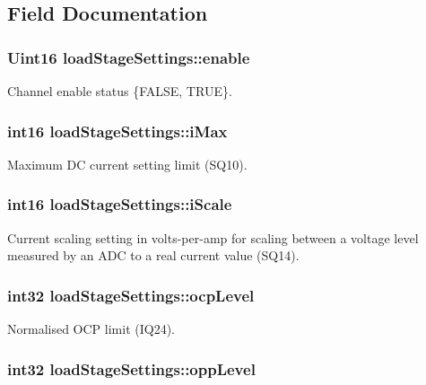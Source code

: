 \subsection{Field Documentation}
\hypertarget{a00008_af9332d3c3009b081949115a9fdfbcea4}{
\subsubsection[{enable}]{\setlength{\rightskip}{0pt plus 5cm}Uint16 load\-Stage\-Settings\-::enable}}\label{a00008_af9332d3c3009b081949115a9fdfbcea4}
Channel enable status \{F\-A\-L\-S\-E, T\-R\-U\-E\}. \hypertarget{a00008_a8e5919538d441c401e9cb53d50d0bdff}{
\subsubsection[{i\-Max}]{\setlength{\rightskip}{0pt plus 5cm}int16 load\-Stage\-Settings\-::i\-Max}}\label{a00008_a8e5919538d441c401e9cb53d50d0bdff}
Maximum D\-C current setting limit (S\-Q10). \hypertarget{a00008_ad9dd47136ae5953dff220a935d0aaa45}{
\subsubsection[{i\-Scale}]{\setlength{\rightskip}{0pt plus 5cm}int16 load\-Stage\-Settings\-::i\-Scale}}\label{a00008_ad9dd47136ae5953dff220a935d0aaa45}
Current scaling setting in volts-\/per-\/amp for scaling between a voltage level measured by an A\-D\-C to a real current value (S\-Q14). \hypertarget{a00008_a0a633f2c0725de044d2eded7d751dd09}{
\subsubsection[{ocp\-Level}]{\setlength{\rightskip}{0pt plus 5cm}int32 load\-Stage\-Settings\-::ocp\-Level}}\label{a00008_a0a633f2c0725de044d2eded7d751dd09}
Normalised O\-C\-P limit (I\-Q24). \hypertarget{a00008_a85ba8c2f7216bf3517190d9c9c429d63}{
\subsubsection[{opp\-Level}]{\setlength{\rightskip}{0pt plus 5cm}int32 load\-Stage\-Settings\-::opp\-Level}}\label{a00008_a85ba8c2f7216bf3517190d9c9c429d63}
